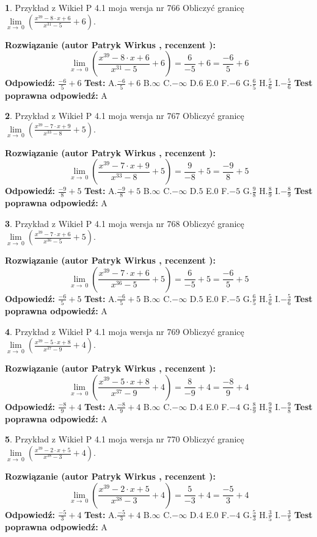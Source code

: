 \documentclass[12pt, a4paper]{article}
\theoremstyle{definition} %
\newtheorem{zad}{}
\newcommand{\zadStart}[1]{\begin{zad}#1\newline}
\newcommand{\zadStop}{\end{zad}}
\newcommand{\rozwStart}[2]{\noindent \textbf{Rozwiązanie (autor #1 , recenzent #2): }\newline}
\newcommand{\rozwStop}{\newline}
\newcommand{\odpStart}{\noindent \textbf{Odpowiedź:}\newline}
\newcommand{\odpStop}{\newline}
\newcommand{\testStart}{\noindent \textbf{Test:}\newline}
\newcommand{\testStop}{\newline}
\newcommand{\kluczStart}{\noindent \textbf{Test poprawna odpowiedź:}\newline}
\newcommand{\kluczStop}{\newline}
\begin{document}
\zadStart{Przykład z Wikieł P 4.1 moja wersja nr 766}
Obliczyć granicę $\lim\limits_{x\to\ 0}(\frac{x^{39}-8 \cdot x +6}{x^{31}-5}+6)$.
\zadStop
\rozwStart{Patryk Wirkus}{}
$$\lim\limits_{x\to\ 0}(\frac{x^{39}-8 \cdot x +6}{x^{31}-5}+6)=\frac{6}{-5}+6=\frac{-6}{5}+6$$
\rozwStop
\odpStart
$\frac{-6}{5}+6$
\odpStop
\testStart
A.$\frac{-6}{5}+6$
B.$\infty$
C.$-\infty$
D.$6$
E.$0$
F.$-6$
G.$\frac{6}{5}$
H.$\frac{5}{6}$
I.$-\frac{5}{6}$
\testStop
\kluczStart
A
\kluczStop



\zadStart{Przykład z Wikieł P 4.1 moja wersja nr 767}
Obliczyć granicę $\lim\limits_{x\to\ 0}(\frac{x^{39}-7 \cdot x +9}{x^{33}-8}+5)$.
\zadStop
\rozwStart{Patryk Wirkus}{}
$$\lim\limits_{x\to\ 0}(\frac{x^{39}-7 \cdot x +9}{x^{33}-8}+5)=\frac{9}{-8}+5=\frac{-9}{8}+5$$
\rozwStop
\odpStart
$\frac{-9}{8}+5$
\odpStop
\testStart
A.$\frac{-9}{8}+5$
B.$\infty$
C.$-\infty$
D.$5$
E.$0$
F.$-5$
G.$\frac{9}{8}$
H.$\frac{8}{9}$
I.$-\frac{8}{9}$
\testStop
\kluczStart
A
\kluczStop



\zadStart{Przykład z Wikieł P 4.1 moja wersja nr 768}
Obliczyć granicę $\lim\limits_{x\to\ 0}(\frac{x^{39}-7 \cdot x +6}{x^{36}-5}+5)$.
\zadStop
\rozwStart{Patryk Wirkus}{}
$$\lim\limits_{x\to\ 0}(\frac{x^{39}-7 \cdot x +6}{x^{36}-5}+5)=\frac{6}{-5}+5=\frac{-6}{5}+5$$
\rozwStop
\odpStart
$\frac{-6}{5}+5$
\odpStop
\testStart
A.$\frac{-6}{5}+5$
B.$\infty$
C.$-\infty$
D.$5$
E.$0$
F.$-5$
G.$\frac{6}{5}$
H.$\frac{5}{6}$
I.$-\frac{5}{6}$
\testStop
\kluczStart
A
\kluczStop



\zadStart{Przykład z Wikieł P 4.1 moja wersja nr 769}
Obliczyć granicę $\lim\limits_{x\to\ 0}(\frac{x^{39}-5 \cdot x +8}{x^{37}-9}+4)$.
\zadStop
\rozwStart{Patryk Wirkus}{}
$$\lim\limits_{x\to\ 0}(\frac{x^{39}-5 \cdot x +8}{x^{37}-9}+4)=\frac{8}{-9}+4=\frac{-8}{9}+4$$
\rozwStop
\odpStart
$\frac{-8}{9}+4$
\odpStop
\testStart
A.$\frac{-8}{9}+4$
B.$\infty$
C.$-\infty$
D.$4$
E.$0$
F.$-4$
G.$\frac{8}{9}$
H.$\frac{9}{8}$
I.$-\frac{9}{8}$
\testStop
\kluczStart
A
\kluczStop



\zadStart{Przykład z Wikieł P 4.1 moja wersja nr 770}
Obliczyć granicę $\lim\limits_{x\to\ 0}(\frac{x^{39}-2 \cdot x +5}{x^{38}-3}+4)$.
\zadStop
\rozwStart{Patryk Wirkus}{}
$$\lim\limits_{x\to\ 0}(\frac{x^{39}-2 \cdot x +5}{x^{38}-3}+4)=\frac{5}{-3}+4=\frac{-5}{3}+4$$
\rozwStop
\odpStart
$\frac{-5}{3}+4$
\odpStop
\testStart
A.$\frac{-5}{3}+4$
B.$\infty$
C.$-\infty$
D.$4$
E.$0$
F.$-4$
G.$\frac{5}{3}$
H.$\frac{3}{5}$
I.$-\frac{3}{5}$
\testStop
\kluczStart
A
\kluczStop
\end{document}
